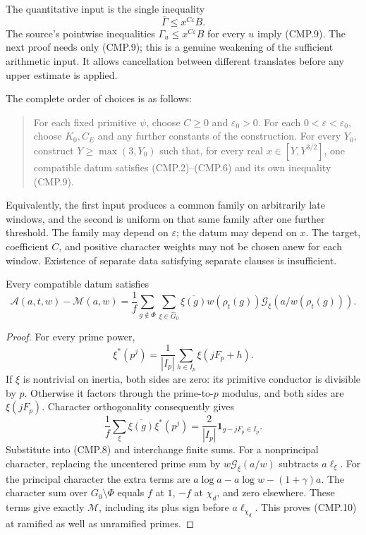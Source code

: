 The quantitative input is the single inequality
\[
                    \overline\Gamma\le x^{C\varepsilon}B.
 \tag{CMP.9}
\]
The source's pointwise inequalities $\Gamma_u\le x^{C\varepsilon}B$
for every $u$ imply (CMP.9).  The next proof needs only (CMP.9);
this is a genuine weakening of the sufficient arithmetic input.
It allows cancellation between different translates before any
upper estimate is applied.

The complete order of choices is as follows:
\begin{quote}
For each fixed primitive $\psi$, choose $C\ge0$ and
$\varepsilon_0>0$.  For each $0<\varepsilon<\varepsilon_0$,
choose $K_0,C_E$ and any further constants of the construction.
For every $Y_0$, construct $Y\ge\max(3,Y_0)$ such that, for
every real $x\in[Y,Y^{3/2}]$, one compatible datum satisfies
(CMP.2)--(CMP.6) and its own inequality (CMP.9).
\end{quote}
Equivalently, the first input produces a common family on
arbitrarily late windows, and the second is uniform on that same
family after one further threshold.  The family may depend on
$\varepsilon$; the datum may depend on $x$.  The target,
coefficient $C$, and positive character weights may not be chosen
anew for each window.  Existence of separate data satisfying
separate clauses is insufficient.

\begin{lemma}
\label{claim:CMP1}
Every compatible datum satisfies
\[
 \mathcal A(a,t,w)-\mathcal M(a,w)
   =\frac1f\sum_{g\notin\Phi}\sum_{\xi\in\widehat G_0}
       \overline{\xi(g)}w(\rho_t(g))
                      \mathcal G_\xi(a/w(\rho_t(g))).
 \tag{CMP.10}
\]
\end{lemma}
\begin{proof}
For every prime power,
\[
 \xi^*(p^j)=\frac1{|I_p|}\sum_{h\in I_p}\xi(jF_p+h).
\]
If $\xi$ is nontrivial on inertia, both sides are zero: its
primitive conductor is divisible by $p$.  Otherwise it factors
through the prime-to-$p$ modulus, and both sides are $\xi(jF_p)$.
Character orthogonality consequently gives
\[
 \frac1f\sum_\xi\overline{\xi(g)}\xi^*(p^j)
          =\frac2{|I_p|}\mathbf1_{g-jF_p\in I_p}.
\]
Substitute into (CMP.8) and interchange finite sums.  For a
nonprincipal character, replacing the uncentered prime sum by
$w\mathcal G_\xi(a/w)$ subtracts $a\ell_\xi$.
For the principal character the extra terms are
$a\log a-a\log w-(1+\gamma)a$.
The character sum over $G_0\setminus\Phi$ equals $f$ at $1$,
$-f$ at $\chi_d$, and zero elsewhere.  These terms give exactly
$\mathcal M$, including its plus sign before $a\ell_{\chi_d}$.
This proves (CMP.10) at ramified as well as unramified primes.
\end{proof}

